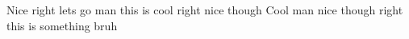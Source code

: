 \documentclass{article}
\begin{document}
 Nice right lets go man this is cool right nice though
 Cool man nice though right this is something bruh
\end{document}
